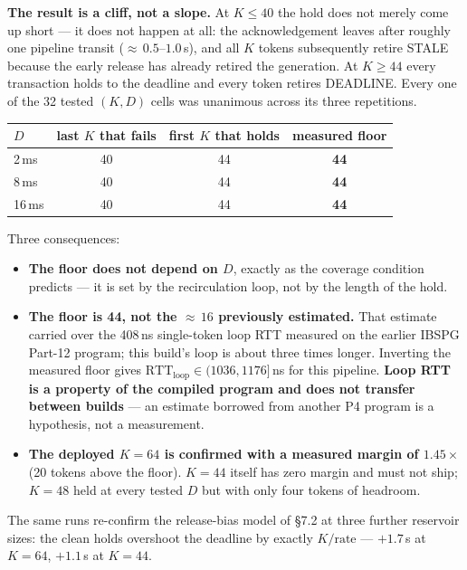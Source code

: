 \documentclass[10pt,a4paper,oneside]{article}
\newcommand{\num}[1]{\mbox{#1}}
\begin{document}
\textbf{The result is a cliff, not a slope.} At $K\le 40$ the hold does not merely come up
short --- it does not happen at all: the acknowledgement leaves after roughly one pipeline
transit (${\approx}\,0.5$--$1.0$\,\textmu s), and all $K$ tokens subsequently retire STALE
because the early release has already retired the generation. At $K\ge 44$ every transaction
holds to the deadline and every token retires DEADLINE. Every one of the 32 tested $(K,D)$
cells was unanimous across its three repetitions.

\begin{center}
\begin{tabular}{lccc}
\toprule
$D$ & \textbf{last $K$ that fails} & \textbf{first $K$ that holds} & \textbf{measured floor} \\
\midrule
2\,ms  & 40 & 44 & \textbf{44} \\
8\,ms  & 40 & 44 & \textbf{44} \\
16\,ms & 40 & 44 & \textbf{44} \\
\bottomrule
\end{tabular}
\end{center}

Three consequences:

\begin{itemize}
\item \textbf{The floor does not depend on $D$}, exactly as the coverage condition predicts
--- it is set by the recirculation loop, not by the length of the hold.
\item \textbf{The floor is 44, not the ${\approx}\,16$ previously estimated.} That estimate
carried over the \num{408}\,ns single-token loop RTT measured on the earlier IBSPG Part-12
program; this build's loop is about three times longer. Inverting the measured floor gives
$\mathrm{RTT}_{\text{loop}}\in(\num{1036},\num{1176}]$\,ns for this pipeline.
\textbf{Loop RTT is a property of the compiled program and does not transfer between
builds} --- an estimate borrowed from another P4 program is a hypothesis, not a measurement.
\item \textbf{The deployed $K=64$ is confirmed with a measured margin of $1.45\times$}
(20 tokens above the floor). $K=44$ itself has zero margin and must not ship; $K=48$ held at
every tested $D$ but with only four tokens of headroom.
\end{itemize}

The same runs re-confirm the release-bias model of \S7.2 at three further reservoir sizes:
the clean holds overshoot the deadline by exactly $K/\text{rate}$ --- $+1.7$\,\textmu s at
$K=64$, $+1.1$\,\textmu s at $K=44$.
\end{document}
